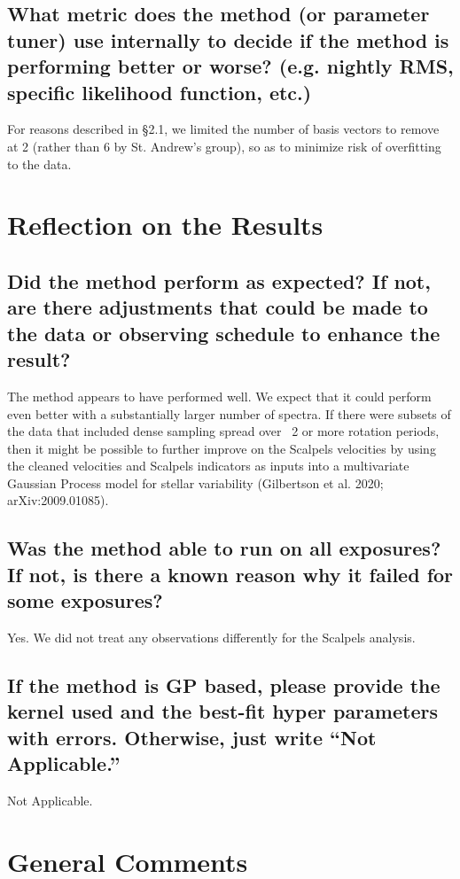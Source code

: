 \documentclass[12pt]{article}
\begin{document}

\subsection{What metric does the method (or parameter tuner) use internally to decide if the method is performing better or worse?  (e.g. nightly RMS, specific likelihood function, etc.)}

For reasons described in \S 2.1, we limited the number of basis vectors to remove at 2 (rather than 6 by St. Andrew's group), so as to minimize risk of overfitting to the data.



\section{Reflection on the Results}
\subsection{Did the method perform as expected?  If not, are there adjustments that could be made to the data or observing schedule to enhance the result?}

The method appears to have performed well.  We expect that it could perform even better with a substantially larger number of spectra.
If there were subsets of the data that included dense sampling spread over ~2 or more rotation periods, then it might be possible to further improve on the Scalpels velocities by using the cleaned velocities and Scalpels indicators as inputs into a multivariate Gaussian Process model for stellar variability (Gilbertson et al. 2020; arXiv:2009.01085).

\subsection{Was the method able to run on all exposures?  If not, is there a known reason why it failed for some exposures?}
Yes.  We did not treat any observations differently for the Scalpels analysis.

\subsection{If the method is GP based, please provide the kernel used and the best-fit hyper parameters with errors.  Otherwise, just write ``Not Applicable.''}
Not Applicable.



\section{General Comments}
\end{document}

